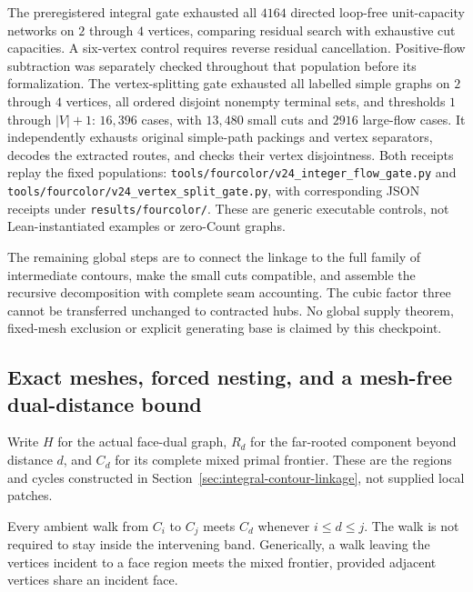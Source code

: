 The preregistered integral gate exhausted all $4164$ directed loop-free
unit-capacity networks on $2$ through $4$ vertices, comparing residual
search with exhaustive cut capacities.  A six-vertex control requires
reverse residual cancellation.  Positive-flow subtraction was separately
checked throughout that population before its formalization.  The
vertex-splitting gate exhausted all labelled simple graphs on $2$ through
$4$ vertices, all ordered disjoint nonempty terminal sets, and thresholds
$1$ through $|V|+1$: $16{,}396$ cases, with $13{,}480$ small cuts and
$2916$ large-flow cases.  It independently exhausts original simple-path
packings and vertex separators, decodes the extracted routes, and checks
their vertex disjointness.  Both receipts replay the fixed populations:
\texttt{tools/fourcolor/v24\_integer\_flow\_gate.py} and
\texttt{tools/fourcolor/v24\_vertex\_split\_gate.py}, with corresponding
JSON receipts under \texttt{results/fourcolor/}.  These are generic
executable controls, not Lean-instantiated examples or zero-Count graphs.

The remaining global steps are to connect the linkage to the full family
of intermediate contours, make the small cuts compatible, and assemble
the recursive decomposition with complete seam accounting.  The cubic
factor three cannot be transferred unchanged to contracted hubs.  No
global supply theorem, fixed-mesh exclusion or explicit generating base
is claimed by this checkpoint.

\subsection{Exact meshes, forced nesting, and a mesh-free dual-distance bound}
\label{sec:contour-mesh-node-chain}

Write $H$ for the actual face-dual graph, $R_d$ for the far-rooted
component beyond distance $d$, and $C_d$ for its complete mixed primal
frontier.  These are the regions and cycles constructed in
Section~\ref{sec:integral-contour-linkage}, not supplied local patches.

\begin{theorem}
Every ambient walk from $C_i$ to $C_j$ meets $C_d$ whenever
$i\le d\le j$.  The walk is not required to stay inside the intervening
band.  Generically, a walk leaving the vertices incident to a face region
meets the mixed frontier, provided adjacent vertices share an incident face.
\end{theorem}

